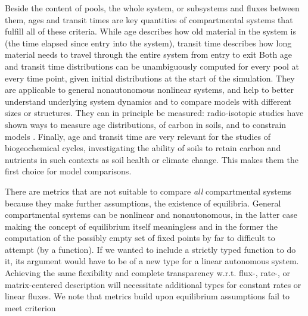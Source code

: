 Beside the content of pools, the whole system, or subsystems and fluxes between
them, ages and transit times are key quantities of compartmental systems that
fulfill all of these criteria. While age describes how old material in the system is (\ie the time elapsed since entry into the system), transit time describes how
long material needs to travel through the entire system from entry to exit
\cite{bolin1973Tellus, Sierra2017GCB} 
Both age and transit time distributions can be unambiguously computed for every pool at every time point, given initial distributions at the start of the simulation.
They are applicable to general nonautonomous nonlinear systems, and help to better understand underlying system dynamics and to compare models
with different sizes or structures. They can in principle be measured: radio-isotopic studies have shown ways to measure age distributions, \eg of carbon in soils, and to constrain models \citep{Trumbore2016, shi_age_2020}.
Finally, age and transit time are very relevant for the studies of biogeochemical cycles, \eg investigating the ability of soils to retain carbon and nutrients in such contexts as soil health or climate change. 
This makes them the first choice for model comparisons. 


There are metrics that are not suitable to compare \emph{all} compartmental systems because they make further assumptions, \eg the existence of equilibria. 
General compartmental systems can be nonlinear and nonautonomous, in the latter case making the concept of equilibrium itself meaningless and in the former the computation of the possibly empty set of fixed points by far to difficult to attempt (by a function).
If we wanted to include a strictly typed function to do it, its argument would
have to be of a new type for a linear autonomous system.  Achieving the same flexibility
and complete transparency w.r.t. flux-, rate-, or matrix-centered description
will necessitate additional types for constant rates or linear fluxes.
We note that metrics build upon equilibrium assumptions fail to meet criterion 

